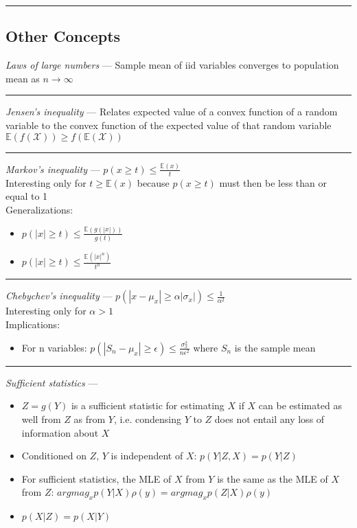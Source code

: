 {\color{black}\hrule height 0.001mm}

\subsection*{Other Concepts}
\emph{Laws of large numbers} --- Sample mean of iid variables converges to population mean as $n \rightarrow \infty$

{\color{lightgray}\hrule height 0.001mm}

\emph{Jensen's inequality} --- Relates expected value of a convex function of a random variable to the convex function of the expected value of that random variable\\
$\mathbb{E}(f(\mathcal{X})) \geq f(\mathbb{E}(\mathcal{X}))$

{\color{lightgray}\hrule height 0.001mm}

\emph{Markov's inequality} --- $p(x \geq t) \leq \frac{\mathbb{E}(x)}{t}$\\
Interesting only for $t \geq \mathbb{E}(x)$ because $p(x \geq t)$ must then be less than or equal to 1\\
Generalizations:
\begin{itemize}
    \item $p(|x| \geq t) \leq \frac{\mathbb{E}(g(|x|))}{g(t)}$
    \item $p(|x| \geq t) \leq \frac{\mathbb{E}(|x|^n)}{t^n}$
\end{itemize}

{\color{lightgray}\hrule height 0.001mm}

\emph{Chebychev's inequality} --- $p( |x - \mu_x| \geq \alpha | \sigma_x |) \leq \frac{1}{\alpha^2}$\\
Interesting only for $\alpha > 1$\\
Implications:
\begin{itemize}
    \item For n variables: $p( |S_n - \mu_x| \geq \epsilon) \leq \frac{\sigma_x^2}{n \epsilon^2}$ where $S_n$ is the sample mean
\end{itemize}

{\color{lightgray}\hrule height 0.001mm}

\emph{Sufficient statistics} --- 
\begin{itemize}
    \item $Z=g(Y)$ is a sufficient statistic for estimating $X$ if $X$ can be estimated as well from $Z$ as from $Y$, i.e. condensing $Y$ to $Z$ does not entail any loss of information about $X$
    \item Conditioned on $Z$, $Y$ is independent of $X$: $p(Y|Z,X) = p(Y|Z)$
    \item For sufficient statistics, the MLE of $X$ from $Y$ is the same as the MLE of $X$ from $Z$: $argmag_x p(Y|X) \rho(y) = argmag_x p(Z|X) \rho(y)$
    \item $p(X|Z) = p(X|Y)$
    
\end{itemize}

